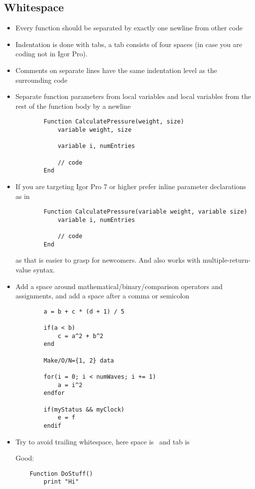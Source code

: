 \documentclass{scrartcl}
\begin{document}
\subsection*{Whitespace}
%
\begin{itemize}
	\item Every function should be separated by exactly one newline from other code
%
	\item Indentation is done with tabs, a tab consists of four spaces (in case you are coding not in Igor Pro).
%
	\item Comments on separate lines have the same indentation level as the surrounding code
%
	\item Separate function parameters from local variables and local variables from the rest of the function body by a newline
	\begin{verbatim}
		Function CalculatePressure(weight, size)
			variable weight, size

			variable i, numEntries

			// code
		End
	\end{verbatim}
%
  \item If you are targeting Igor Pro 7 or higher prefer inline parameter declarations as in
	\begin{verbatim}
		Function CalculatePressure(variable weight, variable size)
			variable i, numEntries

			// code
		End
	\end{verbatim}
  as that is easier to grasp for newcomers. And also works with multiple-return-value syntax.
%
	\item Add a space around mathematical/binary/comparison operators and assignments, and add a space after a comma or semicolon
	\begin{verbatim}
		a = b + c * (d + 1) / 5

		if(a < b)
			c = a^2 + b^2
		end

		Make/O/N={1, 2} data

		for(i = 0; i < numWaves; i += 1)
			a = i^2
		endfor

		if(myStatus && myClock)
			e = f
		endif
	\end{verbatim}
%
	\item Try to avoid trailing whitespace, here space is \FancyVerbSpace\normalfont\ and tab is \FancyVerbTab\par
	Good:\par
	\begin{verbatim}
	Function DoStuff()
		print "Hi"


\end{verbatim}
\end{itemize}
\end{document}
